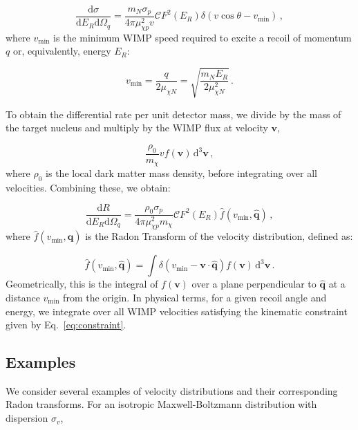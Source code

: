 \begin{equation}
\frac{\textrm{d}\sigma}{\textrm{d}E_R \textrm{d}\Omega_q} = \frac{m_N \sigma_p}{4\pi\mu_{\chi p}^2v} \mathcal{C} F^2(E_R) \delta\left(v \cos\theta - v_\textrm{min}\right)\,,
\end{equation}
where \(v_\textrm{min}\) is the minimum WIMP speed required to excite a recoil of momentum \(q\) or, equivalently, energy \(E_R\):


\begin{equation}
v_\textrm{min} = \frac{q}{2\mu_{\chi N}} = \sqrt{\frac{m_N E_R}{2\mu_{\chi N}^2}}\,.
\end{equation}

To obtain the differential rate per unit detector mass, we divide by the mass of the target nucleus and multiply by the WIMP flux at velocity \(\textbf{v}\),

\begin{equation}
\frac{\rho_0}{m_\chi} v f(\textbf{v}) \, \textrm{d}^3 \textbf{v}\,,
\end{equation}
where \(\rho_0\) is the local dark matter mass density, before integrating over all velocities. Combining these, we obtain:

\begin{equation}
\frac{\textrm{d}R}{\textrm{d}E_R \textrm{d}\Omega_q} = \frac{\rho_0 \sigma_p}{4\pi \mu_{\chi p}^2 m_\chi} \mathcal{C} F^2(E_R) \hat{f}\left(v_\textrm{min},\hat{\textbf{q}}\right)\,,
\end{equation}
where \(\hat{f}\left(v_\textrm{min},\hat{\textbf{q}}\right)\) is the Radon Transform of the velocity distribution, defined as:

\begin{equation}
\hat{f}\left(v_\textrm{min},\hat{\textbf{q}}\right) = \int \delta\left(v_\textrm{min} - \textbf{v}\cdot\hat{\textbf{q}}\right) f(\textbf{v}) \,\textrm{d}^3\textbf{v}\,.
\end{equation}
Geometrically, this is the integral of \(f(\textbf{v})\) over a plane perpendicular to \(\hat{\textbf{q}}\) at a distance \(v_\textrm{min}\) from the origin. In physical terms, for a given recoil angle and energy, we integrate over all WIMP velocities satisfying the kinematic constraint given by Eq.\ \ref{eq:constraint}.

\subsection{Examples}

We consider several examples of velocity distributions and their corresponding Radon transforms. For an isotropic Maxwell-Boltzmann distribution with dispersion $\sigma_v$,

